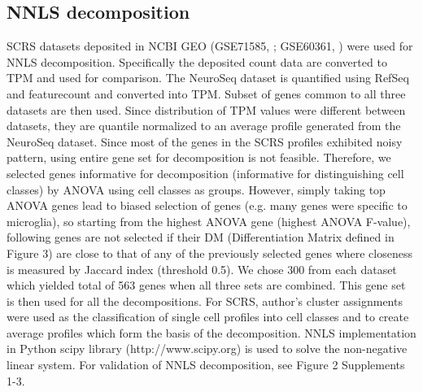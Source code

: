 \subsection{NNLS decomposition}
SCRS datasets deposited in NCBI GEO (GSE71585, \cite{Tasic_2016}; GSE60361, \cite{Zeisel_2015}) were used for NNLS decomposition. Specifically the deposited count data are converted to TPM and used for comparison. The NeuroSeq dataset is quantified using RefSeq and featurecount \citep{Liao_2013} and converted into TPM. Subset of genes common to all three datasets are then used. Since distribution of TPM values were different between datasets, they are quantile normalized to an average profile generated from the NeuroSeq dataset. Since most of the genes in the SCRS profiles exhibited noisy pattern, using entire gene set for decomposition is not feasible. Therefore, we selected genes informative for decomposition (informative for distinguishing cell classes) by ANOVA using cell classes as groups. However, simply taking top ANOVA genes lead to biased selection of genes (e.g. many genes were specific to microglia), so starting from the highest ANOVA gene (highest ANOVA F-value), following genes are not selected if their DM (Differentiation Matrix defined in Figure 3) are close to that of any of the previously selected genes where closeness is measured by Jaccard index (threshold 0.5). We chose 300 from each dataset which yielded total of 563 genes when all three sets are combined. This gene set is then used for all the decompositions. For SCRS, author's cluster assignments were used as the classification of single cell profiles into cell classes and to create average profiles which form the basis of the decomposition. NNLS implementation in Python scipy library (http://www.scipy.org) is used to solve the non-negative linear system. For validation of NNLS decomposition, see Figure 2 Supplements 1-3. 

